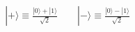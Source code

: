 \documentclass[preview]{standalone}
\begin{document}
\begin{align*}
|+\rangle  \equiv \frac{|0\rangle + |1\rangle}{\sqrt{2}}   \qquad |-\rangle  \equiv \frac{|0\rangle - |1\rangle}{\sqrt{2}}
\end{align*}
\end{document}
